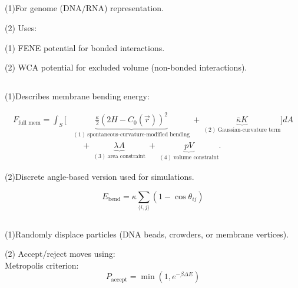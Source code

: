 \documentclass[12pt]{article}
\begin{document}
\begin{flushleft}
  \subsection*{}

     \indent\indent  (1)For genome (DNA/RNA) representation.

      \indent\indent (2) Uses:

         \indent\indent \indent (1) FENE potential for bonded interactions.

          \indent\indent \indent   (2) WCA potential for excluded volume (non-bonded interactions).

  \subsection*{}

  	 \indent\indent(1)Describes membrane bending energy:

\vspace{-1em}
\begin{align}
F_\text{full mem} = \int_S \Bigg[
&\underbrace{\frac{\kappa}{2} \left(2H - C_0(\vec{r}) \right)^2}_{(1)\ \text{spontaneous-curvature-modified bending}} 
\ + \ 
\underbrace{\bar{\kappa} K}_{(2)\ \text{Gaussian-curvature term}} 
\Bigg] dA \nonumber \\
&\quad + \ 
\underbrace{\lambda A}_{(3)\ \text{area constraint}} 
\ + \ 
\underbrace{p V}_{(4)\ \text{volume constraint}}.
\end{align}

\indent\indent (2)Discrete angle-based version used for simulations.

\begin{equation}
E_{\text{bend}} = \kappa \sum_{\langle i,j \rangle} \left(1 - \cos \theta_{ij} \right)
\end{equation}


\subsection*{}

    \indent\indent(1)Randomly displace particles (DNA beads, crowders, or membrane vertices).

   \indent\indent(2) Accept/reject moves using:\\
  \indent\indent\indent Metropolis criterion:
\begin{equation}
P_{\text{accept}} = \min \left(1, e^{-\beta \Delta E}\right)
\end{equation}


\end{flushleft}
\end{document}

